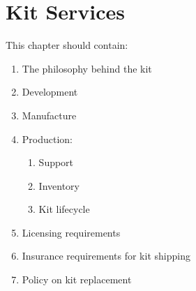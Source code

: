\section{Kit Services}

This chapter should contain:
\begin{enumerate}
\item The philosophy behind the kit
\item Development
\item Manufacture
\item Production:
  \begin{enumerate}
  \item Support
  \item Inventory
  \item Kit lifecycle
  \end{enumerate}
\item Licensing requirements

\item Insurance requirements for kit shipping
\item Policy on kit replacement

\end{enumerate}
